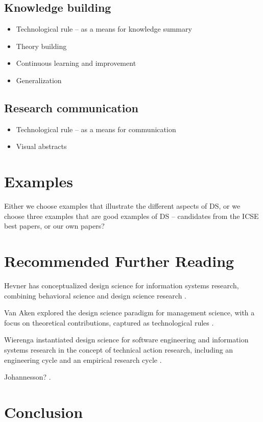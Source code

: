 \documentclass[graybox]{svmult}
\begin{document}
\subsection{Knowledge building}
\label{sec:knowledge}

\begin{itemize}
\item Technological rule -- as a means for knowledge summary
\item Theory building
\item Continuous learning and improvement
\item Generalization
\end{itemize}

\subsection{Research communication}
\label{sec:communication}

\begin{itemize}
\item Technological rule -- as a means for communication
\item Visual abstracts
\end{itemize}


\section{Examples}
Either we choose examples that illustrate the different aspects of DS, or we choose three examples that are good examples of DS -- candidates from the ICSE best papers, or our own papers?



\section{Recommended Further Reading}

Hevner has conceptualized design science for information systems research, combining behavioral science and design science research \cite{hevner_design_2004,hevner_design_2010}.

Van Aken explored the design science paradigm for management science, with a focus on theoretical contributions, captured as technological rules \cite{van_aken_management_2004,van_aken_management_2005}. 

Wierenga instantiated design science for software engineering and information systems research in the concept of technical action research, including an engineering cycle and an empirical research cycle \cite{wieringa_design_2009,wieringa_six_2015,wieringa_technical_2012,wieringa_what_2014}.

Johannesson? \cite{johannesson_introduction_2014}.

\section{Conclusion}





\end{document}
